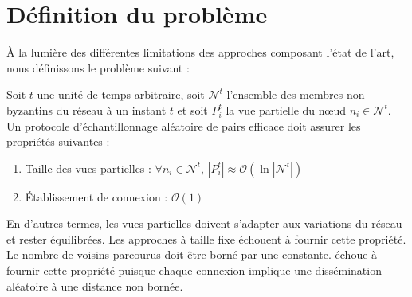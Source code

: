 
\section{Définition du problème}
\label{net:sec:problem}


À la lumière des différentes limitations des approches composant l'état de
l'art, nous définissons le problème suivant :

\begin{problem}
  \label{net:problem:properties}
  Soit $t$ une unité de temps arbitraire, soit $\mathcal{N}^t$ l'ensemble des
  membres non-byzantins du réseau à un instant $t$ et soit $P_i^t$ la vue
  partielle du nœud $n_i \in \mathcal{N}^t$. Un protocole d'échantillonnage
  aléatoire de pairs efficace doit assurer les propriétés suivantes :
  \begin{enumerate}
  \item Taille des vues partielles : \hfill $\forall n_i \in \mathcal{N}^t$,
    $|P_i^t| \approx \mathcal{O}(\ln |\mathcal{N}^t|)$
  \item Établissement de connexion : \hfill $\mathcal{O}(1)$
  \end{enumerate}
\end{problem}
En d'autres termes, les vues partielles doivent s'adapter aux variations du
réseau et rester équilibrées. Les approches à taille fixe échouent à fournir
cette propriété.
Le nombre de voisins parcourus doit être borné par une constante. \SCAMP échoue
à fournir cette propriété puisque chaque connexion implique une dissémination
aléatoire à une distance non bornée.

